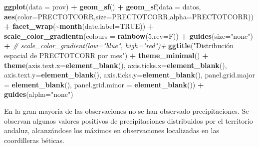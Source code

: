 \documentclass[12pt,a4paper,]{book}
\newenvironment{Shaded}{\begin{snugshade}}{\end{snugshade}}
\newcommand{\AttributeTok}[1]{\textcolor[rgb]{0.13,0.29,0.53}{#1}}
\newcommand{\CommentTok}[1]{\textcolor[rgb]{0.56,0.35,0.01}{\textit{#1}}}
\newcommand{\ConstantTok}[1]{\textcolor[rgb]{0.56,0.35,0.01}{#1}}
\newcommand{\DecValTok}[1]{\textcolor[rgb]{0.00,0.00,0.81}{#1}}
\newcommand{\FunctionTok}[1]{\textcolor[rgb]{0.13,0.29,0.53}{\textbf{#1}}}
\newcommand{\NormalTok}[1]{#1}
\newcommand{\SpecialCharTok}[1]{\textcolor[rgb]{0.81,0.36,0.00}{\textbf{#1}}}
\newcommand{\StringTok}[1]{\textcolor[rgb]{0.31,0.60,0.02}{#1}}
\numberwithin{dummy}{section}
\theoremstyle{ocrenumbox}
\theoremstyle{blacknumex}
\theoremstyle{blacknumbox}
\theoremstyle{ocrenum}
\theoremstyle{ocrenum}
\begin{document}
\begin{Shaded}
\begin{Highlighting}[]
\FunctionTok{ggplot}\NormalTok{(}\AttributeTok{data =}\NormalTok{ prov) }\SpecialCharTok{+} 
  \FunctionTok{geom\_sf}\NormalTok{() }\SpecialCharTok{+}
  \FunctionTok{geom\_sf}\NormalTok{(}\AttributeTok{data =}\NormalTok{ datos, }\FunctionTok{aes}\NormalTok{(}\AttributeTok{color=}\NormalTok{PRECTOTCORR,}\AttributeTok{size=}\NormalTok{PRECTOTCORR,}\AttributeTok{alpha=}\NormalTok{PRECTOTCORR)) }\SpecialCharTok{+}
  \FunctionTok{facet\_wrap}\NormalTok{(}\SpecialCharTok{\textasciitilde{}}\FunctionTok{month}\NormalTok{(date,}\AttributeTok{label=}\ConstantTok{TRUE}\NormalTok{)) }\SpecialCharTok{+} 
  \FunctionTok{scale\_color\_gradientn}\NormalTok{(}\AttributeTok{colours =} \FunctionTok{rainbow}\NormalTok{(}\DecValTok{5}\NormalTok{,}\AttributeTok{rev=}\NormalTok{F)) }\SpecialCharTok{+}
  \FunctionTok{guides}\NormalTok{(}\AttributeTok{size=}\StringTok{"none"}\NormalTok{) }\SpecialCharTok{+}
  \CommentTok{\# scale\_color\_gradient(low="blue", high="red")+}
  \FunctionTok{ggtitle}\NormalTok{(}\StringTok{"Distribución espacial de PRECTOTCORR por mes"}\NormalTok{) }\SpecialCharTok{+}
  \FunctionTok{theme\_minimal}\NormalTok{() }\SpecialCharTok{+}
  \FunctionTok{theme}\NormalTok{(}\AttributeTok{axis.text.x=}\FunctionTok{element\_blank}\NormalTok{(),}
        \AttributeTok{axis.ticks.x=}\FunctionTok{element\_blank}\NormalTok{(),}
        \AttributeTok{axis.text.y=}\FunctionTok{element\_blank}\NormalTok{(),}
        \AttributeTok{axis.ticks.y=}\FunctionTok{element\_blank}\NormalTok{(),}
        \AttributeTok{panel.grid.major =} \FunctionTok{element\_blank}\NormalTok{(),}
        \AttributeTok{panel.grid.minor =} \FunctionTok{element\_blank}\NormalTok{()) }\SpecialCharTok{+}
  \FunctionTok{guides}\NormalTok{(}\AttributeTok{alpha=}\StringTok{"none"}\NormalTok{)}
\end{Highlighting}
\end{Shaded}

En la gran mayoría de las observaciones no se han observado
precipitaciones. Se observan algunos valores positivos de
precipitaciones distribuidos por el territorio andaluz, alcanzándose los
máximos en observaciones localizadas en las coordilleras béticas.
\end{document}
